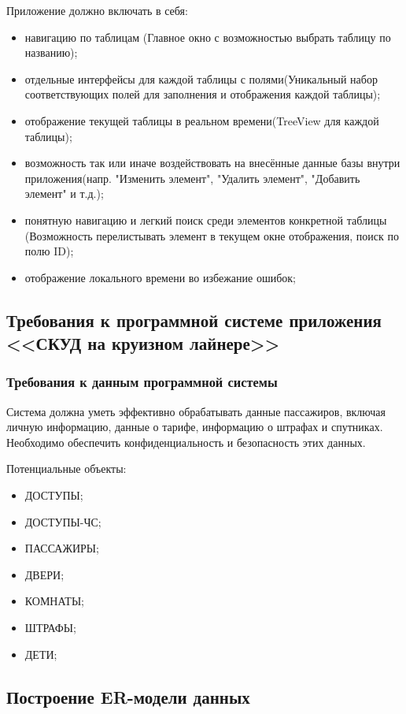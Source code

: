 Приложение должно включать в себя:
\begin{itemize}
	\item навигацию по таблицам (Главное окно с возможностью выбрать таблицу по названию);
	\item отдельные интерфейсы для каждой таблицы с полями(Уникальный набор соответствующих полей для заполнения и отображения каждой таблицы);
	\item отображение текущей таблицы в реальном времени(TreeView для каждой таблицы);
	\item возможность так или иначе воздействовать на внесённые данные базы внутри приложения(напр. "Изменить элемент", "Удалить элемент", "Добавить элемент" и т.д.);
	\item понятную навигацию и легкий поиск среди элементов конкретной таблицы (Возможность перелистывать элемент в текущем окне отображения, поиск по полю ID);
	\item отображение локального времени во избежание ошибок;
\end{itemize}

\subsection{Требования к программной системе приложения <<СКУД на круизном лайнере>>}
\subsubsection{Требования к данным программной системы}

Система должна уметь эффективно обрабатывать данные пассажиров, включая личную информацию, данные о тарифе, информацию о штрафах и спутниках. Необходимо обеспечить конфиденциальность и безопасность этих данных.

Потенциальные объекты:
\begin{itemize}
	\item ДОСТУПЫ;
	\item ДОСТУПЫ-ЧС;
	\item ПАССАЖИРЫ;
	\item ДВЕРИ;
	\item КОМНАТЫ;
	\item ШТРАФЫ;
	\item ДЕТИ;
\end{itemize}


\subsection{Построение ER-модели данных}

